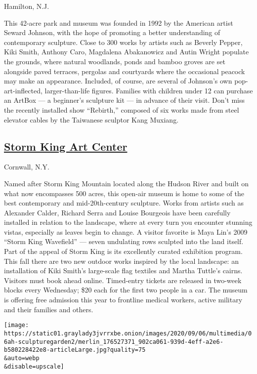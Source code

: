 Hamilton, N.J.

This 42-acre park and museum was founded in 1992 by the American artist
Seward Johnson, with the hope of promoting a better understanding of
contemporary sculpture. Close to 300 works by artists such as Beverly
Pepper, Kiki Smith, Anthony Caro, Magdalena Abakanowicz and Autin Wright
populate the grounds, where natural woodlands, ponds and bamboo groves
are set alongside paved terraces, pergolas and courtyards where the
occasional peacock may make an appearance. Included, of course, are
several of Johnson's own pop-art-inflected, larger-than-life figures.
Families with children under 12 can purchase an ArtBox --- a beginner's
sculpture kit --- in advance of their visit. Don't miss the recently
installed show ``Rebirth,'' composed of six works made from steel
elevator cables by the Taiwanese sculptor Kang Muxiang.

\hypertarget{storm-king-art-center}{%
\subsection{\texorpdfstring{\href{https://stormking.org/}{Storm King Art
Center}}{Storm King Art Center}}\label{storm-king-art-center}}

Cornwall, N.Y.

Named after Storm King Mountain located along the Hudson River and built
on what now encompasses 500 acres, this open-air museum is home to some
of the best contemporary and mid-20th-century sculpture. Works from
artists such as Alexander Calder, Richard Serra and Louise Bourgeois
have been carefully installed in relation to the landscape, where at
every turn you encounter stunning vistas, especially as leaves begin to
change. A visitor favorite is Maya Lin's 2009 ``Storm King Wavefield''
--- seven undulating rows sculpted into the land itself. Part of the
appeal of Storm King is its excellently curated exhibition program. This
fall there are two new outdoor works inspired by the local landscape: an
installation of Kiki Smith's large-scale flag textiles and Martha
Tuttle's cairns. Visitors must book ahead online. Timed-entry tickets
are released in two-week blocks every Wednesday; \$20 each for the first
two people in a car. The museum is offering free admission this year to
frontline medical workers, active military and their families and
others.

\texttt{[image: https://static01.graylady3jvrrxbe.onion/images/2020/09/06/multimedia/06ah-sculpturegarden2/merlin\_176527371\_902ca061-939d-4eff-a2e6-b580228422e8-articleLarge.jpg?quality=75\\\&auto=webp\\\&disable=upscale]}

